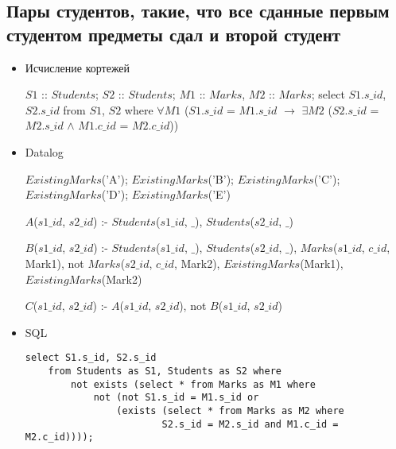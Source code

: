 \documentclass[12pt,a4paper,oneside]{article}
\begin{document}
\subsection{Пары студентов, такие, что все сданные первым студентом предметы сдал и второй студент}

\begin{itemize}

\item Исчисление кортежей

$S1$ :: $Students$; $S2$ :: $Students$; $M1$ :: $Marks$, $M2$ :: $Marks$; select $S1.s\_id$, $S2.s\_id$ from $S1$, $S2$ where $\forall M1$ ($S1.s\_id$ = $M1.s\_id$ $\rightarrow$ $\exists M2$ ($S2.s\_id$ = $M2.s\_id$ $\wedge$ $M1.c\_id$ = $M2.c\_id$))

\item Datalog

$ExistingMarks$('A');
$ExistingMarks$('B');
$ExistingMarks$('C');
$ExistingMarks$('D');
$ExistingMarks$('E')

$A$($s1\_id$, $s2\_id$) :- $Students$($s1\_id$, $\_$), $Students$($s2\_id$, $\_$)

$B$($s1\_id$, $s2\_id$) :- $Students$($s1\_id$, $\_$), $Students$($s2\_id$, $\_$), $Marks$($s1\_id$, $c\_id$, Mark1), not $Marks$($s2\_id$, $c\_id$, Mark2), $ExistingMarks$(Mark1), $ExistingMarks$(Mark2)

$C$($s1\_id$, $s2\_id$) :- $A$($s1\_id$, $s2\_id$), not $B$($s1\_id$, $s2\_id$)

\item SQL

\begin{lstlisting}[label=task8,caption={Задание 8}]
select S1.s_id, S2.s_id
    from Students as S1, Students as S2 where
        not exists (select * from Marks as M1 where
            not (not S1.s_id = M1.s_id or
                (exists (select * from Marks as M2 where
                        S2.s_id = M2.s_id and M1.c_id = M2.c_id))));
\end{lstlisting}

\end{itemize}
\end{document}
